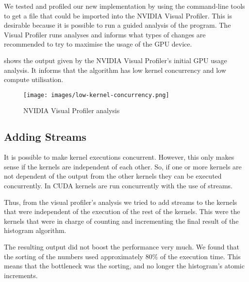 We tested and profiled our new implementation by using the  command-line tools to get a file that could be imported into the NVIDIA Visual Profiler.
This is desirable because it is possible to run a guided analysis of the program.
The Visual Profiler runs analyses and informs what types of changes are recommended to try to maximise the usage of the GPU device.

 shows the output given by the NVIDIA Visual Profiler's initial GPU usage analysis.
It informs that the algorithm has low kernel concurrency and low compute utilisation.

\begin{figure}[htb]
  \centering
  \texttt{[image: images/low-kernel-concurrency.png]}
  \caption{NVIDIA Visual Profiler analysis}
  \label{fig:first impl}
\end{figure}

\subsection{Adding Streams}

It is possible to make kernel executions concurrent.
However, this only makes sense if the kernels are independent of each other.
So, if one or more kernels are not dependent of the output from the other kernels they can be executed concurrently.
In CUDA kernels are run concurrently with the use of streams.

Thus, from the visual profiler's analysis we tried to add streams to the kernels that were independent of the execution of the rest of the kernels.
This were the kernels that were in charge of counting and incrementing the final result of the histogram algorithm.


The resulting output did not boost the performance very much.
We found that the sorting of the numbers used approximately $80\%$ of the execution time.
This means that the bottleneck was the sorting, and no longer the histogram's atomic increments.
